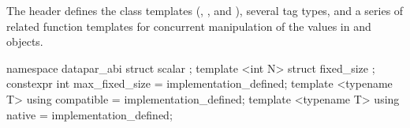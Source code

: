 

\pnum
The header  defines the class templates (\datapar, \mask, and ), several tag types, and a series of related function templates for concurrent manipulation of the values in \datapar and \mask objects.


\begin{itemdecl}
namespace datapar_abi {
  struct scalar {};
  template <int N> struct fixed_size {};
  constexpr int max_fixed_size = implementation_defined;
  template <typename T> using compatible = implementation_defined;
  template <typename T> using native = implementation_defined;
}
\end{itemdecl}
